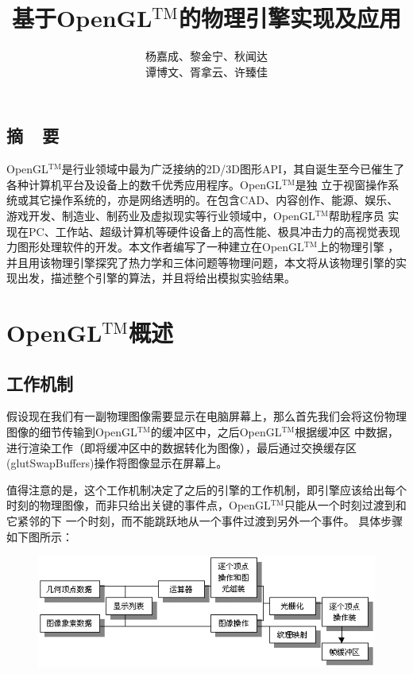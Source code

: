 ﻿\documentclass{article}
\newcommand{\kai}{\CJKfamily{KaiTi}}
\renewenvironment{abstract}{
\subsection*{\textbf{摘~~要}}
\kai
}{}
\begin{document}
	\title{\textbf{基于OpenGL$^{\text{TM}}$的物理引擎实现及应用}}
	\author{杨嘉成、黎金宁、秋闻达\\谭博文、胥拿云、许臻佳}
	\maketitle
	\begin{abstract}
		OpenGL$^{\text{TM}}$是行业领域中最为广泛接纳的2D/3D图形API\cite{ref2}，其自诞生至今已催生了各种计算机平台及设备上的数千优秀应用程序。OpenGL$^{\text{TM}}$是独
		立于视窗操作系统或其它操作系统的，亦是网络透明的。在包含CAD、内容创作、能源、娱乐、游戏开发、制造业、制药业及虚拟现实等行业领域中，OpenGL$^{\text{TM}}$帮助程序员
		实现在PC、工作站、超级计算机等硬件设备上的高性能、极具冲击力的高视觉表现力图形处理软件的开发。本文作者编写了一种建立在OpenGL$^{\text{TM}}$上的物理引擎
		\cite{ref1}，并且用该物理引擎探究了热力学和三体问题等物理问题，本文将从该物理引擎的实现出发，描述整个引擎的算法，并且将给出模拟实验结果。
	\end{abstract}
	\tableofcontents
	\newpage
	\section{OpenGL$^{\text{TM}}$概述}
	\subsection{工作机制}
	\indent 假设现在我们有一副物理图像需要显示在电脑屏幕上，那么首先我们会将这份物理图像的细节传输到OpenGL$^{\text{TM}}$的缓冲区中，之后OpenGL$^{\text{TM}}$根据缓冲区
	中数据，进行渲染工作（即将缓冲区中的数据转化为图像），最后通过交换缓存区(glutSwapBuffers)操作将图像显示在屏幕上。\par
	值得注意的是，这个工作机制决定了之后的引擎的工作机制，即引擎应该给出每个时刻的物理图像，而非只给出关键的事件点，OpenGL$^{\text{TM}}$只能从一个时刻过渡到和它紧邻的下
	一个时刻，而不能跳跃地从一个事件过渡到另外一个事件。
	具体步骤如下图所示：
	\begin{figure}[!htbp]
		\centering
		\includegraphics[width=15.5cm]{graph1.jpg}
	\end{figure}
\end{document}
